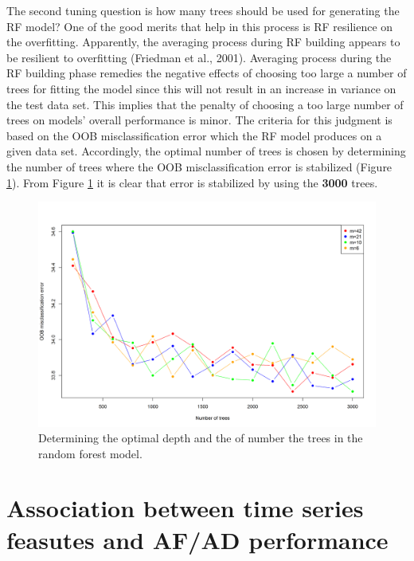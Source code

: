 \documentclass[]{elsarticle} %
\begin{document}
The second tuning question is how many trees should be used for
generating the RF model? One of the good merits that help in this
process is RF resilience on the overfitting. Apparently, the averaging
process during RF building appears to be resilient to overfitting
(Friedman et al., 2001). Averaging process during the RF building phase
remedies the negative effects of choosing too large a number of trees
for fitting the model since this will not result in an increase in
variance on the test data set. This implies that the penalty of choosing
a too large number of trees on models' overall performance is minor. The
criteria for this judgment is based on the OOB misclassification error
which the RF model produces on a given data set. Accordingly, the
optimal number of trees is chosen by determining the number of trees
where the OOB misclassification error is stabilized (Figure
\ref{fig:tree_depth}). From Figure \ref{fig:tree_depth} it is clear that
error is stabilized by using the \textbf{3000} trees.

\begin{figure}[H]

{\centering \includegraphics[width=0.9\linewidth]{img/300dpi/Fig_tree_depth_and_ntrees} 

}

\caption{Determining the optimal depth and the of number the trees in the random forest model.}\label{fig:tree_depth}
\end{figure}

\hypertarget{res}{%
\section{Association between time series feasutes and AF/AD
performance}\label{res}}
\end{document}
